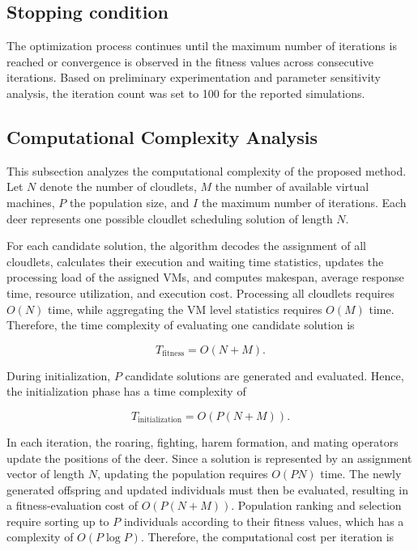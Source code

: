 \documentclass[pdflatex,sn-mathphys-num]{sn-jnl}%
\begin{document}
\subsection{Stopping condition}\label{subsec4.10}
The optimization process continues until the maximum number of iterations is reached or convergence is observed in the fitness values across consecutive iterations. Based on preliminary experimentation and parameter sensitivity analysis, the iteration count was set to 100 for the reported simulations.

\subsection{Computational Complexity Analysis}
\label{subsec:complexity_analysis}

This subsection analyzes the computational complexity of the proposed
method. Let \(N\) denote the number of
cloudlets, \(M\) the number of available virtual machines, \(P\) the
population size, and \(I\) the maximum number of iterations. Each deer represents one possible
cloudlet scheduling solution of length \(N\). 

For each candidate solution, the algorithm decodes the assignment of all
cloudlets, calculates their execution and waiting time statistics, updates
the processing load of the assigned VMs, and computes makespan, average
response time, resource utilization, and execution cost. Processing all
cloudlets requires \(O(N)\) time, while aggregating the VM level statistics
requires \(O(M)\) time. Therefore, the time complexity of evaluating one
candidate solution is

\begin{equation}
T_{\mathrm{fitness}} = O(N + M).
\label{eq:fitness_complexity}
\end{equation}

During initialization, \(P\) candidate solutions are generated and evaluated.
Hence, the initialization phase has a time complexity of

\begin{equation}
T_{\mathrm{initialization}} = O(P(N + M)).
\label{eq:initialization_complexity}
\end{equation}

In each iteration, the roaring, fighting, harem formation, and mating
operators update the positions of the deer. Since a solution is represented
by an assignment vector of length \(N\), updating the population requires
\(O(PN)\) time. The newly generated offspring and updated individuals must
then be evaluated, resulting in a fitness-evaluation cost of
\(O(P(N+M))\). Population ranking and selection require sorting up to \(P\)
individuals according to their fitness values, which has a complexity of
\(O(P\log P)\). Therefore, the computational cost per iteration is
\end{document}
